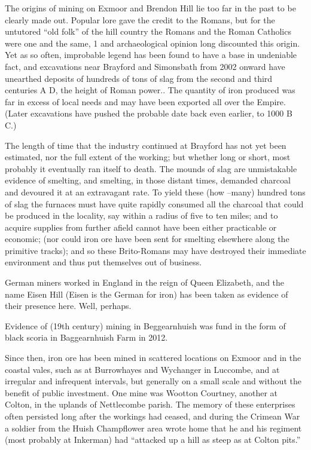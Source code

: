 \documentclass[11pt]{book}
\begin{document}
The origins of mining on Exmoor and Brendon Hill lie too far in the past to be clearly made out. Popular lore gave the credit to the Romans, but for the untutored “old folk” of the hill country the Romans and the Roman Catholics were one and the same, 1 and archaeological opinion long discounted this origin. Yet as so often, improbable legend has been found to have a base in undeniable fact, and excavations near Brayford and Simonsbath from 2002 onward have unearthed deposits of hundreds of tons of slag from the second and third centuries A D, the height of Roman power.. The quantity of iron produced was far in excess of local needs and may have been exported all over the Empire.  (Later excavations have pushed the probable date back even earlier, to 1000 B C.)

The length of time that the industry continued at Brayford has not yet been estimated, nor the full extent of the working; but whether long or short, most probably it eventually ran itself to death.  The mounds of slag are unmistakable evidence of smelting, and smelting, in those distant times, demanded charcoal and devoured it at an extravagant rate. To yield these (how –many) hundred tons of slag the furnaces must have quite rapidly consumed all the charcoal that could be produced in the locality, say within a radius of five to ten miles; and to acquire supplies from further afield cannot have been either practicable or economic; (nor could iron ore have been sent for smelting elsewhere along the primitive tracks); and so these Brito-Romans may have destroyed their immediate environment and thus put themselves out of business.

German miners worked in England in the reign of Queen Elizabeth, and the name Eisen Hill (Eisen is the German for iron) has been taken as evidence of their presence here. Well, perhaps.  

Evidence of (19th century) mining in Beggearnhuish was fund in the form of black scoria in Baggearnhuish Farm in 2012.

Since then, iron ore has been mined in scattered locations on Exmoor and in the coastal vales, such as at Burrowhayes and Wychanger in Luccombe, and at irregular and infrequent intervals, but generally on a small scale and without the benefit of public investment.  One mine was Wootton Courtney, another at Colton, in the uplands of Nettlecombe parish. The memory of these enterprises often persisted long after the workings had ceased, and during the Crimean War   a soldier from the Huish Champflower area wrote home that he and his regiment (most probably at Inkerman) had “attacked up a hill as steep as at Colton pits.”
\end{document}

